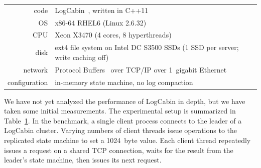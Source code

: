 \begin{table}
\centering
\begin{tabular}{r l}
code & LogCabin~\cite{logcabin}, written in C++11 \\
OS & x86-64 RHEL6 (Linux 2.6.32) \\
CPU & Xeon X3470 (4 cores, 8 hyperthreads) \\
disk & ext4 file system on Intel DC S3500 SSDs (1 SSD per server; write
caching off) \\
network & Protocol Buffers~\cite{Varda:2008} over TCP/IP over 1~gigabit Ethernet \\
configuration & in-memory state machine, no log compaction
\end{tabular}
\label{tab:performance:setup}
\end{table}

We have not yet analyzed the performance of LogCabin in depth, but we
have taken some initial measurements. The experimental setup is
summarized in Table~\ref{tab:performance:setup}. In the benchmark, a
single client process connects to the leader of a LogCabin cluster.
Varying numbers of client threads issue operations to the replicated state machine
to set a \SI{1024}{byte} value. Each client thread repeatedly issues a
request on a shared TCP connection, waits for the result from the
leader's state machine, then issues its next request.

